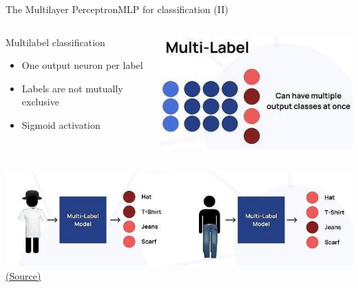 \documentclass[10pt,compress]{beamer} %
\begin{document}
\begin{frame}{The Multilayer Perceptron}{MLP for classification (II)} 
    \begin{columns}
	\begin{flushleft}
	Multilabel classification
	\begin{itemize}
		\item One output neuron per label
		\item Labels are not mutually exclusive
		\item Sigmoid activation
	\end{itemize}
	\end{flushleft}

    	\centering \includegraphics[width=0.8\linewidth]{figs/multilabel.jpg}\\
    \end{columns}

    \bigskip 

    \centering \includegraphics[width=0.7\linewidth]{figs/multilabel-example.jpg}\\
		\tiny \href{https://www.analyticsvidhya.com/blog/2021/07/demystifying-the-difference-between-multi-class-and-multi-label-classification-problem-statements-in-deep-learning/}{(Source)}
\end{frame}
\end{document}
